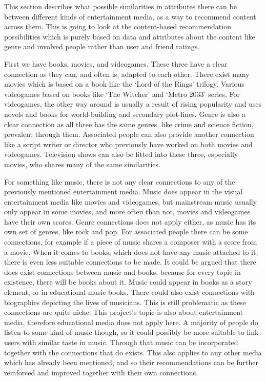 This section describes what possible similarities in attributes there can be between different kinds of entertainment media, as a way to recommend content across them. This is going to look at the content-based recommendation possibilities which is purely based on data and attributes about the content like genre and involved people rather than user and friend ratings.

First we have books, movies, and videogames. These three have a clear connection as they can, and often is, adapted to each other. There exist many movies which is based on a book like the ‘Lord of the Rings’ trilogy. Various videogames based on books like ‘The Witcher’ and ‘Metro 2033’ series. For videogames, the other way around is usually a result of rising popularity and uses novels and books for world-building and secondary plot-lines. Genre is also a clear connection as all three has the same genres, like crime and science fiction, prevalent through them. Associated people can also provide another connection like a script writer or director who previously have worked on both movies and videogames. Television shows can also be fitted into these three, especially movies, who shares many of the same similarities.

For something like music, there is not any clear connections to any of the previously mentioned entertainment media. Music does appear in the visual entertainment media like movies and videogames, but mainstream music usually only appear in some movies, and more often than not, movies and videogames have their own scores. Genre connections does not apply either, as music has its own set of genres, like rock and pop. For associated people there can be some connections, for example if a piece of music shares a composer with a score from a movie. When it comes to books, which does not have any music attached to it, there is even less suitable connections to be made. It could be argued that there does exist connections between music and books, because for every topic in existence, there will be books about it. Music could appear in books as a story element, or in educational music books. There could also exist connections with biographies depicting the lives of musicians. This is still problematic as these connections are quite niche. This project’s topic is also about entertainment media, therefore educational media does not apply here. A majority of people do listen to some kind of music though, so it could possibly be more suitable to link users with similar taste in music. Through that music can be incorporated together with the connections that do exists. This also applies to any other media which has already been mentioned, and so their recommendations can be further reinforced and improved together with their own connections.

